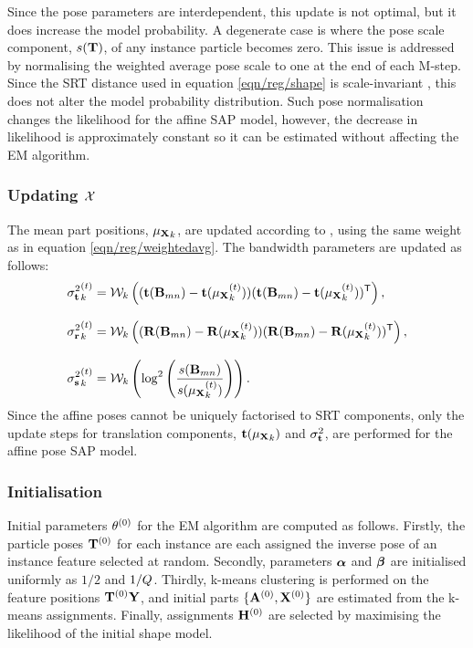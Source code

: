 Since the pose parameters are interdependent, this update is not optimal, but it does increase the model probability.
A degenerate case is where the pose scale component, $s(\mathbf{T})$, of any instance particle becomes zero. This issue is addressed by normalising the weighted average pose scale to one at the end of each M-step. Since the SRT distance used in equation \ref{eqn/reg/shape} is scale-invariant \cite{Pham2011}, this does not alter the model probability distribution. Such pose normalisation changes the likelihood for the affine SAP model, however, the decrease in likelihood is approximately constant so it can be estimated without affecting the EM algorithm.

\subsubsection{Updating $\mathcal{X}$}
The mean part positions, ${\mu_{\mathbf{X}}}_k$, are updated according to \cite{Pham2011}, using the same weight as in equation \ref{eqn/reg/weightedavg}. The bandwidth parameters are updated as follows:
\begin{align}
	{\sigma^{2}_{\mathbf{t}}}_{k}^{(t)} & = \mathcal{W}_k\left((\mathbf{t}(\mathbf{B}_{mn}) - \mathbf{t}({\mu_{\mathbf{X}}}_{k}^{(t)}))(\mathbf{t}(\mathbf{B}_{mn}) - \mathbf{t}({\mu_{\mathbf{X}}}_{k}^{(t)}))^{\textsf{T}}\right) \label{eqn/reg/updatemeant}, \\[3mm] 
	{\sigma^{2}_{\mathbf{r}}}_{k}^{(t)} & = \mathcal{W}_k\left((\mathbf{R}(\mathbf{B}_{mn}) - \mathbf{R}({\mu_{\mathbf{X}}}_{k}^{(t)}))(\mathbf{R}(\mathbf{B}_{mn}) - \mathbf{R}({\mu_{\mathbf{X}}}_{k}^{(t)}))^{\textsf{T}}\right) \label{eqn/reg/updatedmeanr}, \\[3mm]
	{\sigma^{2}_{\mathbf{s}}}_{k}^{(t)} & = \mathcal{W}_k\left(\log^2\left(\frac{s(\mathbf{B}_{mn})}{s({\mu_{\mathbf{X}}}_{k}^{(t)})}\right)\right). \label{eqn/reg/updatemeans}
\end{align}
Since the affine poses cannot be uniquely factorised to SRT components, only the update steps for translation components, \ie $\mathbf{t}({\mu_{\mathbf{X}}}_k)$ and ${\sigma^{2}_{\mathbf{t}}}$, are performed for the affine pose SAP model. 

\subsubsection{Initialisation}
Initial parameters $\theta^{(0)}$ for the EM algorithm are computed as follows. Firstly, the particle poses $\mathbf{T}^{(0)}$ for each instance are each assigned the inverse pose of an instance feature selected at random. Secondly, parameters $\bm{\alpha}$ and $\bm{\beta}$ are initialised uniformly as $1/2$ and $1/Q$. Thirdly, k-means clustering is performed on the feature positions $\mathbf{T}^{(0)}\mathbf{Y}$, and initial parts $\{\mathbf{A}^{(0)}, \mathbf{X}^{(0)}\}$ are estimated from the k-means assignments. Finally, assignments $\mathbf{H}^{(0)}$ are selected by maximising the likelihood of the initial shape model.


